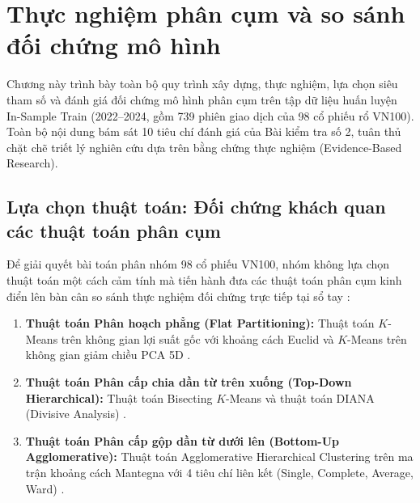 \documentclass[12pt,a4paper,oneside,openany]{report}
\begin{document}
\chapter{Thực nghiệm phân cụm và so sánh đối chứng mô hình}
\label{chap:thucnghiemphancum}

Chương này trình bày toàn bộ quy trình xây dựng, thực nghiệm, lựa chọn siêu tham số và đánh giá đối chứng mô hình phân cụm trên tập dữ liệu huấn luyện In-Sample Train (2022--2024, gồm 739 phiên giao dịch của 98 cổ phiếu rổ VN100). Toàn bộ nội dung bám sát 10 tiêu chí đánh giá của Bài kiểm tra số 2, tuân thủ chặt chẽ triết lý nghiên cứu dựa trên bằng chứng thực nghiệm (Evidence-Based Research).

\section{Lựa chọn thuật toán: Đối chứng khách quan các thuật toán phân cụm}
\label{sec:chon_thuat_toan}

Để giải quyết bài toán phân nhóm 98 cổ phiếu VN100, nhóm không lựa chọn thuật toán một cách cảm tính mà tiến hành đưa các thuật toán phân cụm kinh điển lên bàn cân so sánh thực nghiệm đối chứng trực tiếp tại sổ tay :
\begin{enumerate}
  \item \textbf{Thuật toán Phân hoạch phẳng (Flat Partitioning):} Thuật toán $K$-Means trên không gian lợi suất gốc với khoảng cách Euclid và $K$-Means trên không gian giảm chiều PCA 5D \cite{macqueen1967}.
  \item \textbf{Thuật toán Phân cấp chia dần từ trên xuống (Top-Down Hierarchical):} Thuật toán Bisecting $K$-Means và thuật toán DIANA (Divisive Analysis) \cite{kaufman1990}.
  \item \textbf{Thuật toán Phân cấp gộp dần từ dưới lên (Bottom-Up Agglomerative):} Thuật toán Agglomerative Hierarchical Clustering trên ma trận khoảng cách Mantegna với 4 tiêu chí liên kết (Single, Complete, Average, Ward) \cite{ward1963, mantegna1999}.
\end{enumerate}
\end{document}
